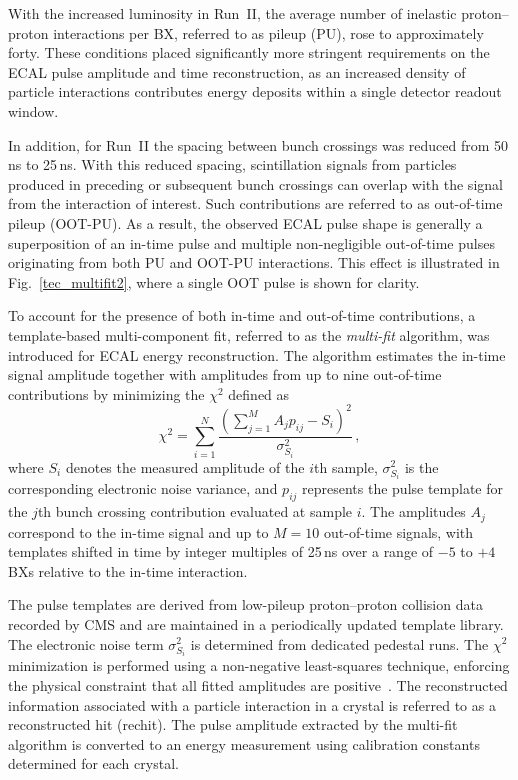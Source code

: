 With the increased luminosity in Run~II, the average number of inelastic proton--proton interactions per BX, referred to as pileup (PU), rose to approximately forty.
These conditions placed significantly more stringent requirements on the ECAL pulse amplitude and time reconstruction, as an increased density of particle interactions contributes energy deposits within a single detector readout window.

In addition, for Run~II the spacing between bunch crossings was reduced from 50\,ns to 25\,ns.
With this reduced spacing, scintillation signals from particles produced in preceding or subsequent bunch crossings can overlap with the signal from the interaction of interest.
Such contributions are referred to as out-of-time pileup (OOT-PU).
As a result, the observed ECAL pulse shape is generally a superposition of an in-time pulse and multiple non-negligible out-of-time pulses originating from both PU and OOT-PU interactions.
This effect is illustrated in Fig.~\ref{tec_multifit2}, where a single OOT pulse is shown for clarity.

To account for the presence of both in-time and out-of-time contributions, a template-based multi-component fit, referred to as the \emph{multi-fit} algorithm, was introduced for ECAL energy reconstruction.
The algorithm estimates the in-time signal amplitude together with amplitudes from up to nine out-of-time contributions by minimizing the $\chi^{2}$ defined as
\begin{equation}
    \chi^{2} = \sum_{i=1}^{N} \frac{\left( \sum_{j=1}^{M} A_{j} p_{ij} - S_{i} \right)^{2}}{\sigma^{2}_{S_{i}}} \, ,
    \label{en-mf}
\end{equation}
where $S_{i}$ denotes the measured amplitude of the $i$th sample, $\sigma^{2}_{S_{i}}$ is the corresponding electronic noise variance, and $p_{ij}$ represents the pulse template for the $j$th bunch crossing contribution evaluated at sample $i$.
The amplitudes $A_{j}$ correspond to the in-time signal and up to $M=10$ out-of-time signals, with templates shifted in time by integer multiples of 25\,ns over a range of $-5$ to $+4$ BXs relative to the in-time interaction.

The pulse templates are derived from low-pileup proton--proton collision data recorded by CMS and are maintained in a periodically updated template library.
The electronic noise term $\sigma^{2}_{S_{i}}$ is determined from dedicated pedestal runs.
The $\chi^{2}$ minimization is performed using a non-negative least-squares technique, enforcing the physical constraint that all fitted amplitudes are positive~\cite{massironi2015precision}.
The reconstructed information associated with a particle interaction in a crystal is referred to as a reconstructed hit (rechit).
The pulse amplitude extracted by the multi-fit algorithm is converted to an energy measurement using calibration constants determined for each crystal.

